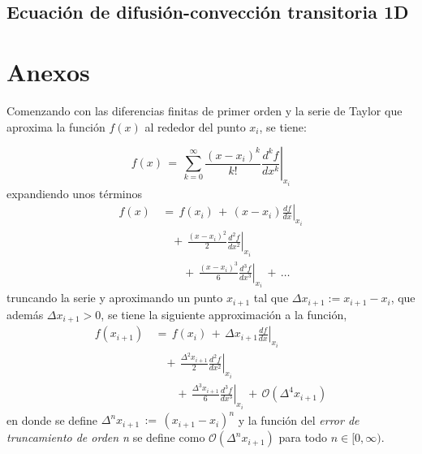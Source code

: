\documentclass[9pt,technote,twoside,letterpaper,onecolumn]{IEEEtran}
\begin{document}
\begin{multicols}{2}
\section{Ecuación de difusión-convección transitoria 1D}
\label{sec:dif-conv-trans}



\end{multicols}

\section{Anexos}
\label{sec:anexos}

Comenzando con las diferencias finitas de primer orden y la serie de Taylor que aproxima la función $f(x)$ al rededor del punto $x_i$, se tiene:

\begin{equation}
  f(x)\,=\,\sum^\infty_{k=0}\frac{(x-x_i)^k}{k!}\left.\frac{d^kf}{dx^k}\right|_{x_i}
  \label{eq:taylor}
\end{equation}
expandiendo unos términos
\begin{equation}
  \begin{split}
    f(x)&\,=\,f(x_i)\,+\,(x-x_i)\left.\frac{df}{dx}\right|_{x_i}\\
    &\quad+\,\frac{(x-x_i)^2}{2}\left.\frac{d^2f}{dx^2}\right|_{x_i}\\
    &\qquad+\,\frac{(x-x_i)^3}{6}\left.\frac{d^3f}{dx^3}\right|_{x_i}\,+\,\ldots
  \end{split}
  \label{eq:taylorexp}
\end{equation}
truncando la serie y aproximando un punto $x_{i+1}$ tal que $\Delta x_{i+1}:=x_{i+1}-x_i$, que además $\Delta x_{i+1}>0$, se tiene la siguiente approximación a la función,
\begin{equation}
  \begin{split}
    f(x_{i+1})&\,=\,f(x_i)\,+\,\Delta x_{i+1}\left.\frac{df}{dx}\right|_{x_i}\\
    &\quad+\,\frac{\Delta^2 x_{i+1}}{2}\left.\frac{d^2f}{dx^2}\right|_{x_i}\\
    &\qquad+\,\frac{\Delta^3 x_{i+1}}{6}\left.\frac{d^3f}{dx^3}\right|_{x_i}\,+\,\mathcal{O}(\Delta^4 x_{i+1})
  \end{split}
  \label{eq:taylorapprx}
\end{equation}
en donde se define $\Delta^n x_{i+1}\,:=\,(x_{i+1}-x_i)^n$ y la función del \emph{error de truncamiento de orden n} se define como $\mathcal{O}(\Delta^n x_{i+1})$ para todo $n\in[0,\infty)$.
\end{document}
